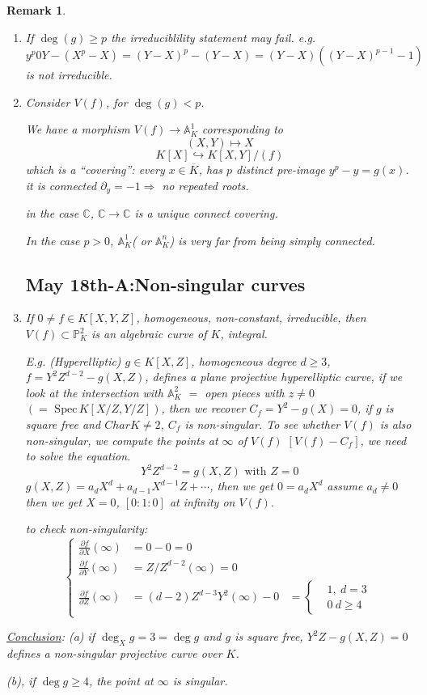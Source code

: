 \documentclass[11pt]{article}
\newtheorem{rmk}[thm]{Remark}
\newcommand{\spec}{\text{ Spec}\,}
\newcommand{\affn}{\mathbb A}
\newcommand{\proj}{\mathbb P}
\newcommand{\cplx}{\mathbb C}
\newcommand{\pd}{\partial}
\newcommand{\Lrta}{\Longrightarrow}
\newcommand{\lrta}{\longrightarrow}
\newcommand{\inj}{\hookrightarrow}
\begin{document}
\begin{rmk}
\begin{enumerate}[label=(\arabic*)]
\item 
If $\deg(g)\geq p$ the irreduciblility statement may fail.
e.g. $y^p0Y-(X^p-X)=(Y-X)^p-(Y-X)=(Y-X)((Y-X)^{p-1}-1)$ is not irreducible.

\item Consider $V(f)$, for $\deg(g)<p$.

We have a morphism $V(f)\lrta \affn^1_K$ corresponding to
 $$(X,Y)\longmapsto X$$
 $$
K[X]\inj K[X,Y]/(f)
 $$
 which is a ``covering'': every $x\in \overline{K}$, has $p$ distinct pre-image $y^p-y=g(x)$. it is connected $\pd_y=-1\Lrta $ no repeated roots.

in the case $\cplx$, $\cplx\lrta \cplx$ is a unique connect covering.

In the case $p>0$, $\affn^1_K$( or $\affn^n_K$) is very far from being simply connected.
\subsection{May 18th-A:Non-singular curves}
\item If $0\neq f\in K[X,Y,Z]$, homogeneous, non-constant, irreducible, then $V(f)\subset \proj^2_K$ is an algebraic curve of $K$, integral.

E.g. (Hyperelliptic) $g\in K[X,Z]$, homogeneous degree $d\geq 3$, $f=Y^2Z^{d-2}-g(X,Z)$, defines a plane projective hyperelliptic curve, if we look at the intersection with $\affn^2_K$ $=$ open pieces with $z\neq 0$ $(=\spec K[X/Z,Y/Z])$, then we recover $C_f=Y^2-g(X)=0$, if $g$ is square free and $Char K\neq 2$, $C_f$ is non-singular. To see whether  $V(f)$ is also non-singular, we compute the points at $\infty$ of $V(f)$ $[V(f)-C_f]$, we need to solve the equation. 
$$
Y^2 Z^{d-2}=g(X,Z) \text{ with } Z=0
$$
$g(X,Z)=a_d X^{d}+a_{d-1}X^{d-1}Z+\cdots$, then we get $0=a_d X^d$ assume $a_d\neq 0$ then we get $X=0$, $[0:1:0]$ at infinity on $V(f).$

to check non-singularity:
$$
\left\{
\begin{aligned}
\frac{\pd f}{\pd X}(\infty)&=0-0=0\\
\frac{\pd f}{\pd Y}(\infty)&=Z/Z^{d-2}(\infty)=0\\
\frac{\pd f}{\pd Z}(\infty)&=(d-2)Z^{d-3}Y^2(\infty)-0&=\left\{
\begin{aligned}
&1, \ d=3\\
&0 \ d\geq 4
\end{aligned}
\right.
\end{aligned}
\right.
$$
\end{enumerate}
\underline{Conclusion}: (a) if $\deg_X g=3=\deg g$ and $g$ is square free, $Y^2Z-g(X,Z)=0$ defines a non-singular projective curve over $K$.

(b), if $\deg g \geq 4$, the point at  $\infty $ is singular.
\end{rmk}
\end{document}
